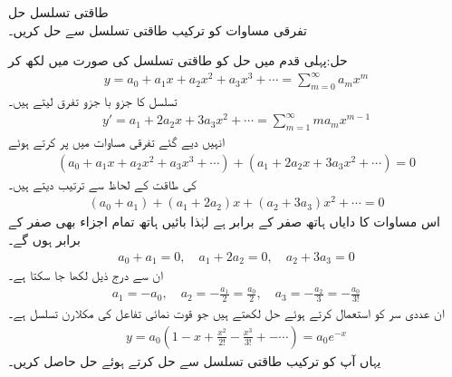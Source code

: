 \quad طاقتی تسلسل حل \\
تفرقی مساوات  کو ترکیب طاقتی تسلسل سے حل کریں۔

حل:پہلی قدم میں حل کو طاقتی تسلسل کی صورت میں لکھ کر
\begin{align}\label{مساوات_بیسل_طاقتی_تسلسل_حل_الف}
y=a_0+a_1x+a_2x^2+a_3x^3+\cdots=\sum_{m=0}^{\infty} a_m x^m
\end{align}
تسلسل کا جزو با جزو تفرق لیتے ہیں۔
\begin{align}\label{مساوات_بیسل_طاقتی_تسلسل_حل_ب}
y'=a_1+2a_2x+3a_3x^2+\cdots=\sum_{m=1}^{\infty} ma_mx^{m-1}
\end{align}
انہیں دیے گئے تفرقی مساوات میں پر کرتے ہوئے
\begin{align*}
(a_0+a_1x+a_2x^2+a_3x^3+\cdots)+(a_1+2a_2x+3a_3x^2+\cdots)=0
\end{align*}
 کی طاقت کے لحاظ سے ترتیب دیتے ہیں۔
\begin{align*}
(a_0+a_1)+(a_1+2a_2)x+(a_2+3a_3)x^2+\cdots=0
\end{align*}
اس مساوات کا دایاں ہاتھ صفر کے برابر ہے لہٰذا بائیں ہاتھ تمام اجزاء بھی صفر کے برابر ہوں گے۔
\begin{align*}
a_0+a_1=0,\quad a_1+2a_2=0, \quad a_2+3a_3=0
\end{align*}
ان سے درج ذیل لکھا جا سکتا ہے۔
\begin{align*}
a_1=-a_0,\quad a_2=-\frac{a_1}{2}=\frac{a_0}{2},\quad a_3=-\frac{a_2}{3}=-\frac{a_0}{3!}
\end{align*}
ان عددی سر کو استعمال کرتے ہوئے  حل  لکھتے ہیں جو قوت نمائی تفاعل  کی مکلارن تسلسل ہے۔
\begin{align*}
y=a_0(1-x+\frac{x^2}{2!}-\frac{x^3}{3!}+-\cdots)=a_0 e^{-x}
\end{align*}
یہاں آپ   کو ترکیب طاقتی تسلسل سے حل کرتے ہوئے حل  حاصل کریں۔

